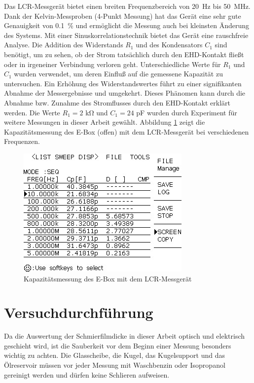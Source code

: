 Das LCR-Messgerät bietet einen breiten Frequenzbereich von \SI{20}{\Hz} bis \SI{50}{\MHz}.
Dank der Kelvin-Messproben (4-Punkt Messung) hat das Gerät eine sehr gute Genauigkeit von \SI{0.1}{\percent} und ermöglicht die Messung auch bei kleinsten Änderung des Systems.
Mit einer Sinuskorrelationstechnik bietet das Gerät eine rauschfreie Analyse.
Die Addition des Widerstands $R_1$ und des Kondensators $C_1$ sind benötigt, um zu sehen, ob der Strom tatsächlich durch den EHD-Kontakt fließt oder in irgeneiner Verbindung verloren geht.
Unterschiedliche Werte für $R_1$ und $C_1$ wurden verwendet, um deren Einfluß auf die gemessene Kapazität zu untersuchen.
Ein Erhöhung des Widerstandswertes führt zu einer signifikanten Abnahme der Messergebnisse und umgekehrt.
Dieses Phänomen kann durch die Abnahme bzw. Zunahme des Stromflusses durch den EHD-Kontakt erklärt werden.
Die Werte $R_1 = 2$ \si{\kilo\ohm} und $C_1 = 24$ \si{\pico\farad} wurden durch Experiment für weitere Messungen in dieser Arbeit gewählt.
Abbildung \ref{fig:lcr_ebox_capacitance} zeigt die Kapazitätsmessung des E-Box (offen) mit dem LCR-Messgerät bei verschiedenen Frequenzen.
\begin{figure}[htb]
    \centering
    \includegraphics[width=0.5\linewidth]{./images/lcr_ebox_capacitance.jpg}
    \caption{Kapazitätsmessung des E-Box mit dem LCR-Messgerät}
    \label{fig:lcr_ebox_capacitance}
\end{figure}

\section{Versuchdurchführung}
\label{sec:versuchdurchfuehrung}


Da die Auswertung der Schmierfilmdicke in dieser Arbeit optisch und elektrisch geschieht wird, ist die Sauberkeit vor dem Beginn einer Messung besonders wichtig zu achten.
Die Glasscheibe, die Kugel, das Kugelsupport und das Ölreservoir müssen vor jeder Messung mit Waschbenzin oder Isopropanol gereinigt werden und dürfen keine Schlieren aufweisen.

